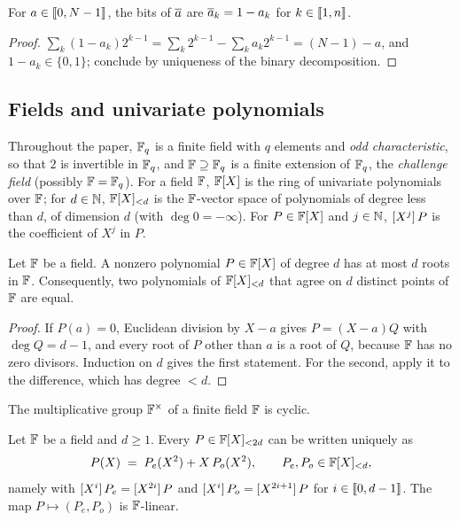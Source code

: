 \begin{lemma}[Complement]\label{lem:complement}
For $a \in \llbracket 0, N-1 \rrbracket$, the bits of $\overline{a}$ are $\overline{a}_k = 1 - a_k$ for $k \in \llbracket 1, n \rrbracket$.
\end{lemma}

\begin{proof}
$\sum_k (1-a_k) 2^{k-1} = \sum_k 2^{k-1} - \sum_k a_k 2^{k-1} = (N-1) - a$, and $1 - a_k \in \{0,1\}$; conclude by uniqueness of the binary decomposition.
\end{proof}

\subsection{Fields and univariate polynomials}\label{sec:prelim:fields}

Throughout the paper, $\mathbb{F}_q$ is a finite field with $q$ elements and \emph{odd characteristic}, so that $2$ is invertible in $\mathbb{F}_q$, and $\mathbb{F} \supseteq \mathbb{F}_q$ is a finite extension of $\mathbb{F}_q$, the \emph{challenge field} (possibly $\mathbb{F} = \mathbb{F}_q$).
For a field $\mathbb{F}$, $\mathbb{F}[X]$ is the ring of univariate polynomials over $\mathbb{F}$; for $d \in \mathbb{N}$, $\mathbb{F}[X]_{<d}$ is the $\mathbb{F}$-vector space of polynomials of degree less than $d$, of dimension $d$ (with $\deg 0 = -\infty$).
For $P \in \mathbb{F}[X]$ and $j \in \mathbb{N}$, $[X^{j}]\,P$ is the coefficient of $X^j$ in $P$.

\begin{lemma}\label{lem:roots}
Let $\mathbb{F}$ be a field. A nonzero polynomial $P \in \mathbb{F}[X]$ of degree $d$ has at most $d$ roots in $\mathbb{F}$.
Consequently, two polynomials of $\mathbb{F}[X]_{<d}$ that agree on $d$ distinct points of $\mathbb{F}$ are equal.
\end{lemma}

\begin{proof}
If $P(a) = 0$, Euclidean division by $X - a$ gives $P = (X-a)Q$ with $\deg Q = d-1$, and every root of $P$ other than $a$ is a root of $Q$, because $\mathbb{F}$ has no zero divisors. Induction on $d$ gives the first statement. For the second, apply it to the difference, which has degree $< d$.
\end{proof}

\begin{fact}[{\cite[Theorem~2.8]{LN97}}]\label{fact:cyclic}
The multiplicative group $\mathbb{F}^{\times}$ of a finite field $\mathbb{F}$ is cyclic.
\end{fact}

\begin{lemma}\label{lem:split-poly}
Let $\mathbb{F}$ be a field and $d \ge 1$. Every $P \in \mathbb{F}[X]_{<2d}$ can be written uniquely as
\[
  P(X) \;=\; P_e(X^2) + X\,P_o(X^2), \qquad P_e, P_o \in \mathbb{F}[X]_{<d},
\]
namely with $[X^{i}]\,P_e = [X^{2i}]\,P$ and $[X^{i}]\,P_o = [X^{2i+1}]\,P$ for $i \in \llbracket 0, d-1 \rrbracket$.
The map $P \mapsto (P_e, P_o)$ is $\mathbb{F}$-linear.
\end{lemma}

